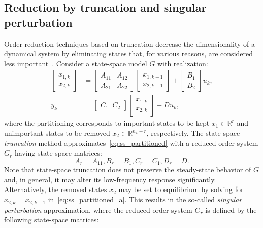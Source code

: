 \documentclass{article} %
\newcommand{\R}{\mathbb{R}}
\newcommand{\nx}{{n_x}}
\begin{document}
\subsection{Reduction by truncation and singular perturbation}\label{sec:MOR}
Order reduction techniques based on truncation decrease the dimensionality of a dynamical system by eliminating states that, for various reasons, are considered less important~\cite{green12}. Consider a state-space model $G$ with realization:
\begin{subequations}  
\label{eq:ss_partitioned}
\begin{align}\label{eq:ss_partitioned_a}
    \begin{bmatrix}
    x_{1,k}\\
    x_{2,k}
    \end{bmatrix}
    &=
    \begin{bmatrix}A_{11} & A_{12} \\ A_{21} & A_{22} \end{bmatrix}     
    \begin{bmatrix}
    x_{1,k-1}\\
    x_{2,k-1}
    \end{bmatrix} + \begin{bmatrix}B_1\\B_2 \end{bmatrix} u_k, \\
    y_k &= \begin{bmatrix}C_1\;\; C_2\end{bmatrix} \begin{bmatrix}x_{1,k}\\ x_{2,k} \end{bmatrix} + D u_k,
\end{align}
\end{subequations}
where the partitioning corresponds to important states to be kept $x_1 \in \R^r$ and unimportant states to be removed $x_2 \in \R^{\nx - r}$, respectively. The state-space \emph{truncation} method approximates~\eqref{eq:ss_partitioned} with a reduced-order system $G_r$ having state-space matrices:
\begin{equation}
\label{eq:balanced_truncation}
A_r = A_{11}, B_r = B_1, C_r = C_1, D_r = D.
\end{equation}
Note that state-space truncation does not preserve the steady-state behavior of $G$
and, in general, it may alter its low-frequency response significantly. 
Alternatively, the removed states $x_2$ may be set to equilibrium by solving for $x_{2,k}= x_{2,k-1}$ in~\eqref{eq:ss_partitioned_a}. This results in the so-called \emph{singular perturbation} approximation, where the reduced-order system $G_r$ is defined by the following state-space matrices:
\end{document}
